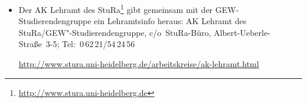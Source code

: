 \begin{itemize}
\item Der AK Lehramt des StuRa\footnote{\url{http://www.stura.uni-heidelberg.de}} gibt gemeinsam mit der  GEW-Stu\-dier\-en\-den\-grup\-pe ein Lehramtsinfo heraus: \newline AK Lehramt des StuRa/GEW"-Studierendengruppe, c/o~StuRa-Büro, Albert-Ueberle-Straße~3-5; Tel:~0\,62\,21/54\,24\,56

      \url{http://www.stura.uni-heidelberg.de/arbeitskreise/ak-lehramt.html}

\end{itemize}


